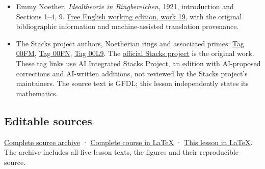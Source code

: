 \documentclass[
]{article}
\providecommand{\tightlist}{%
  \setlength{\itemsep}{0pt}\setlength{\parskip}{0pt}}
\begin{document}
\begin{itemize}
\tightlist
\item
  Emmy Noether, \emph{Idealtheorie in Ringbereichen}, 1921, introduction
  and Sections 1--4, 9.
  \href{https://github.com/KokunoYumeto/emmy-noether-en/blob/main/source/Noether_English_ED0014.tex}{Free
  English working edition, work 19}, with the original bibliographic
  information and machine-assisted translation provenance.
\item
  The Stacks project authors, Noetherian rings and associated primes:
  \href{https://kokunoyumeto.github.io/stacks-zh-hans-cn/en/algebra.html\#section-Noetherian}{Tag
  00FM},
  \href{https://kokunoyumeto.github.io/stacks-zh-hans-cn/en/algebra.html\#lemma-Noetherian-permanence}{Tag
  00FN},
  \href{https://kokunoyumeto.github.io/stacks-zh-hans-cn/en/algebra.html\#section-ass}{Tag
  00L9}. The \href{https://stacks.math.columbia.edu/}{official Stacks
  project} is the original work. These tag links use AI Integrated
  Stacks Project, an edition with AI-proposed corrections and AI-written
  additions, not reviewed by the Stacks project's maintainers. The
  source text is GFDL; this lesson independently states its mathematics.
\end{itemize}

\subsection{Editable sources}\label{editable-sources}

\href{ideal-theory-in-rings-source.zip}{Complete source archive} ·
\href{ideal-theory-in-rings.tex}{Complete course in LaTeX} ·
\href{NOE-IDL-01.tex}{This lesson in LaTeX}. The archive includes all
five lesson texts, the figures and their reproducible source.
\end{document}
